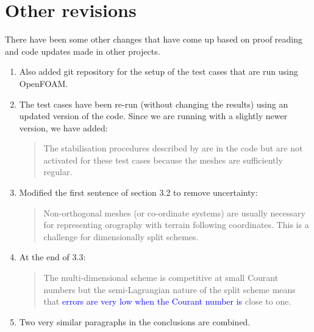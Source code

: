\documentclass[12pt]{article}
\begin{document}
\section*{Other revisions}

There have been some other changes that have come up based on proof reading and code updates made in other projects.
\begin{enumerate}
\item Also added git repository for the setup of the test cases that are run using OpenFOAM.
\item The test cases have been re-run (without changing the results) using an updated version of the code. Since we are running with a slightly newer version, we have added:
\begin{quote}
The stabilisation procedures described by \cite{SWMD17} are in the code but are not activated for these test cases because the meshes are sufficiently regular.
\end{quote}

\item Modified the first sentence of section 3.2 to remove uncertainty:
\begin{quote}
Non-orthogonal meshes (or co-ordinate systems) are usually necessary for representing orography with terrain following coordinates. This is a challenge for dimensionally split schemes.
\end{quote}

\item At the end of 3.3:
\begin{quote}
The multi-dimensional scheme is competitive at small Courant numbers but the semi-Lagrangian nature of the split scheme means that \textcolor{blue}{errors are very low when the Courant number is} close to one.
\end{quote}

\item Two very similar paragraphs in the conclusions are combined. 

\end{enumerate}



\end{document}
